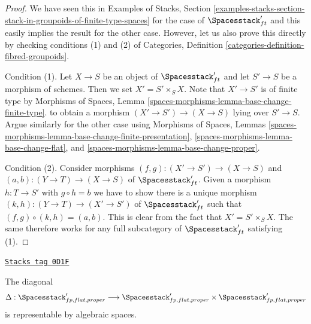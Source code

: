 \begin{proof}
We have seen this in
Examples of Stacks, Section
\ref{examples-stacks-section-stack-in-groupoids-of-finite-type-spaces}
for the case of $\Spacesstack'_{ft}$ and this easily implies the
result for the other case. However, let us also prove
this directly by checking conditions (1) and (2) of
Categories, Definition \ref{categories-definition-fibred-groupoids}.

\medskip\noindent
Condition (1). Let $X \to S$ be an object of $\Spacesstack'_{ft}$
and let $S' \to S$ be a morphism of schemes. Then we set
$X' = S' \times_S X$. Note that $X' \to S'$ is of finite type
by Morphisms of Spaces, Lemma
\ref{spaces-morphisms-lemma-base-change-finite-type}.
to obtain a morphism $(X' \to S') \to (X \to S)$
lying over $S' \to S$.
Argue similarly for the other case using
Morphisms of Spaces, Lemmas
\ref{spaces-morphisms-lemma-base-change-finite-presentation},
\ref{spaces-morphisms-lemma-base-change-flat}, and
\ref{spaces-morphisms-lemma-base-change-proper}.

\medskip\noindent
Condition (2). Consider morphisms
$(f, g) : (X' \to S') \to (X \to S)$ and $(a, b) : (Y \to T) \to (X \to S)$
of $\Spacesstack'_{ft}$. Given a morphism $h : T \to S'$ with
$g \circ h = b$ we have to show
there is a unique morphism $(k, h) : (Y \to T) \to (X' \to S')$ of
$\Spacesstack'_{ft}$ such that
$(f, g) \circ (k, h) = (a, b)$.
This is clear from the fact that $X' = S' \times_S X$.
The same therefore works for any full subcategory of
$\Spacesstack'_{ft}$ satisfying (1).
\end{proof}

\begin{lemma}
\label{quot-lemma-spaces-diagonal}
\href{https://stacks.math.columbia.edu/tag/0D1F}{\texttt{Stacks tag 0D1F}}

The diagonal
$$
\Delta : \Spacesstack'_{fp, flat, proper} \longrightarrow
\Spacesstack'_{fp, flat, proper} \times \Spacesstack'_{fp, flat, proper}
$$
is representable by algebraic spaces.
\end{lemma}

